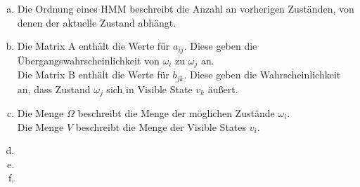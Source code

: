 \documentclass[a4paper]{scrartcl}
\begin{document}
\begin{enumerate}[(a)]
	\item Die Ordnung eines HMM beschreibt die Anzahl an vorherigen Zuständen, von denen der aktuelle Zustand abhängt.
	
	\item Die Matrix A enthält die Werte für $a_{ij}$. Diese geben die Übergangswahrscheinlichkeit von $\omega_i$ zu $\omega_j$ an.\\
	
	Die Matrix B enthält die Werte für $b_{jk}$. Diese geben die Wahrscheinlichkeit an, dass Zustand $\omega_j$ sich in Visible State $v_k$ äußert.\\
	
	\item Die Menge $\Omega$ beschreibt die Menge der möglichen Zustände $\omega_i$.\\
	
	Die Menge $V$ beschreibt die Menge der Visible States $v_i$.
	\item 
	\item 
	\item 
\end{enumerate}
\end{document}
